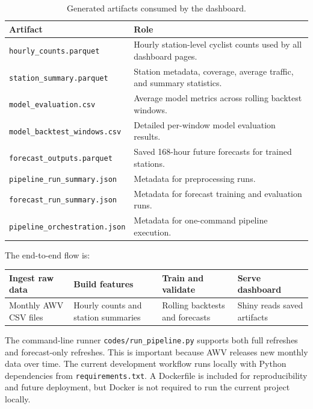 \documentclass[11pt]{article}
\newcommand{\code}[1]{\texttt{#1}}
\begin{document}
\begin{table}[htbp]
\centering
\caption{Generated artifacts consumed by the dashboard.}
\small
\begin{tabularx}{0.96\textwidth}{lX}
\toprule
\textbf{Artifact} & \textbf{Role} \\
\midrule
\code{hourly\_counts.parquet} & Hourly station-level cyclist counts used by all dashboard pages. \\
\code{station\_summary.parquet} & Station metadata, coverage, average traffic, and summary statistics. \\
\code{model\_evaluation.csv} & Average model metrics across rolling backtest windows. \\
\code{model\_backtest\_windows.csv} & Detailed per-window model evaluation results. \\
\code{forecast\_outputs.parquet} & Saved 168-hour future forecasts for trained stations. \\
\code{pipeline\_run\_summary.json} & Metadata for preprocessing runs. \\
\code{forecast\_run\_summary.json} & Metadata for forecast training and evaluation runs. \\
\code{pipeline\_orchestration.json} & Metadata for one-command pipeline execution. \\
\bottomrule
\end{tabularx}
\end{table}

The end-to-end flow is:

\begin{center}
\small
\begin{tabularx}{0.96\textwidth}{>{\centering\arraybackslash}X>{\centering\arraybackslash}X>{\centering\arraybackslash}X>{\centering\arraybackslash}X}
\toprule
Ingest raw data & Build features & Train and validate & Serve dashboard \\
\midrule
Monthly AWV CSV files & Hourly counts and station summaries & Rolling backtests and forecasts & Shiny reads saved artifacts \\
\bottomrule
\end{tabularx}
\end{center}

The command-line runner \code{codes/run\_pipeline.py} supports both full refreshes and forecast-only refreshes. This is important because AWV releases new monthly data over time. The current development workflow runs locally with Python dependencies from \code{requirements.txt}. A Dockerfile is included for reproducibility and future deployment, but Docker is not required to run the current project locally.
\end{document}
